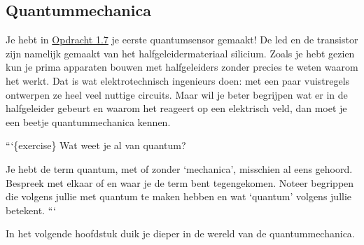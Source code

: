 \hypertarget{quantummechanica}{%
\subsection{Quantummechanica}\label{quantummechanica}}

Je hebt in \href{ex1.7}{Opdracht 1.7} je eerste quantumsensor gemaakt!
De led en de transistor zijn namelijk gemaakt van het
halfgeleidermateriaal silicium. Zoals je hebt gezien kun je prima
apparaten bouwen met halfgeleiders zonder precies te weten waarom het
werkt. Dat is wat elektrotechnisch ingenieurs doen: met een paar
vuistregels ontwerpen ze heel veel nuttige circuits. Maar wil je beter
begrijpen wat er in de halfgeleider gebeurt en waarom het reageert op
een elektrisch veld, dan moet je een beetje quantummechanica kennen.

```\{exercise\} Wat weet je al van quantum?

Je hebt de term quantum, met of zonder `mechanica', misschien al eens
gehoord. Bespreek met elkaar of en waar je de term bent tegengekomen.
Noteer begrippen die volgens jullie met quantum te maken hebben en wat
`quantum' volgens jullie betekent. ```

In het volgende hoofdstuk duik je dieper in de wereld van de
quantummechanica.
